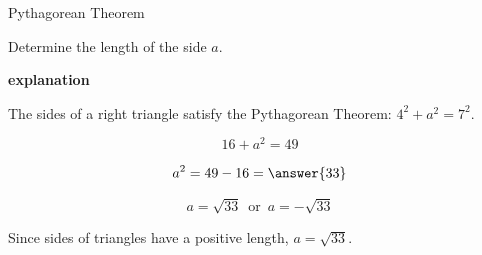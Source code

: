 \documentclass{ximera}
\begin{document}
\begin{example} Pythagorean Theorem




Determine the length of the side $a$. 






\begin{image}[3in]
  \end{image}



\textbf{\textcolor{red!75!green}{explanation}} 


The sides of a right triangle satisfy the Pythagorean Theorem: $4^2 + a^2 = 7^2$.


\[  16 + a^2 = 49       \]

\[  a^2 = 49 - 16 = \answer{33}     \]

\[  a = \sqrt{33} \, \text{ or } \, a = -\sqrt{33}    \]



Since sides of triangles have a positive length, $a = \sqrt{33}$.







\end{example}
\end{document}
